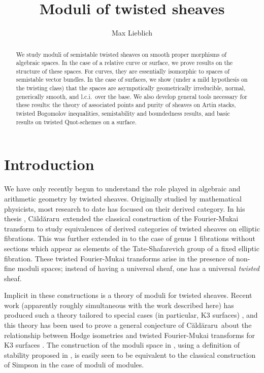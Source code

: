 \documentclass[11pt]{amsart}
\author{Max Lieblich}
\title{Moduli of twisted sheaves}
\date{}
\newcommand{\Caldararu}{C\u ald\u araru}
\renewcommand{\[}{[\!\hspace{0.03em}[}
\renewcommand{\]}{]\!\hspace{0.03em}]}
\renewcommand{\(}{(\!\hspace{0.03em}(}
\renewcommand{\)}{)\!\hspace{0.03em})}
\theoremstyle{definition}
\theoremstyle{remark}
\begin{document}




\begin{abstract} We study moduli of semistable twisted sheaves
on smooth proper morphisms of algebraic spaces.  In the 
case of a relative curve or surface, we prove results on the structure 
of these spaces.  For curves, they are essentially isomorphic to spaces 
of semistable vector bundles.  In the case of surfaces, we show (under 
a mild hypothesis on the twisting class) that the spaces are asympotically 
geometrically irreducible, normal, generically smooth, and l.c.i.\ over 
the base.  We also develop general tools necessary for these results: 
the theory of associated points and purity of sheaves on Artin 
stacks, twisted Bogomolov inequalities, semistability and boundedness 
results, and basic results on twisted Quot-schemes on a surface.
\end{abstract}

\maketitle

\tableofcontents

\section{Introduction}

We have only recently begun to understand the role played in algebraic and arithmetic geometry by twisted sheaves.  Originally studied by mathematical physicists,
most research to date has focused on their derived category.  In his thesis \cite {caldararu}, \Caldararu\ extended the classical construction of the Fourier-Mukai transform to study equivalences of derived categories of twisted sheaves on elliptic fibrations.  This was further extended in \cite {pantev-donagi} to the case of genus 1 fibrations without sections which appear as elements of the Tate-Shafarevich group of a fixed elliptic fibration.  These twisted Fourier-Mukai transforms arise in the presence of non-fine moduli spaces; instead of having a universal sheaf, one has a universal \emph {twisted\/} sheaf.

Implicit in these constructions is a theory of moduli for twisted sheaves.  Recent work (apparently roughly simultaneous with the work described here) has produced such a theory tailored to special cases (in particular, K3 surfaces) \cite {yoshioka3}, and this theory has been used to prove a general conjecture of \Caldararu\ about the relationship between Hodge isometries and twisted Fourier-Mukai transforms for K3 surfaces \cite {huybrechts-stellari}.  The construction of the moduli space in \cite {yoshioka3}, using a definition of stability proposed in \cite{caldararu2}, is easily seen to be equivalent to the classical construction of Simpson in the case of moduli of modules.
\end{document}
